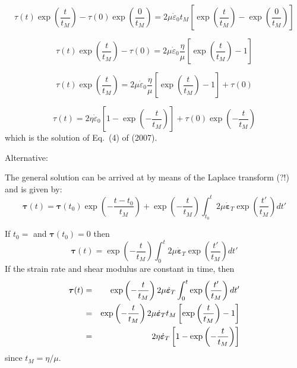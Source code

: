 \[
\tau(t) \exp\left( \frac{t}{t_M}   \right)
-
\tau(0) \exp\left( \frac{0}{t_M}   \right)
 =
 2\mu \dot\varepsilon_0  t_M  [ \exp\left( \frac{t}{t_M}   \right)  -  \exp\left( \frac{0}{t_M} \right) ]
\]

\[
\tau(t) \exp\left( \frac{t}{t_M}   \right)
- \tau(0) 
=
2 \mu  \dot\varepsilon_0 \frac{\eta}{\mu} [ \exp\left( \frac{t}{t_M}   \right) -1 ]
\]

\[
\tau(t) \exp\left( \frac{t}{t_M} \right)
=
2 \mu  \dot\varepsilon_0 \frac{\eta}{\mu} [ \exp\left( \frac{t}{t_M}   \right) -1 ] + \tau(0) 
\]

\[
\tau(t) 
=
2 \eta  \dot\varepsilon_0  [1- \exp\left( -\frac{t}{t_M}\right) ] + \tau(0) \exp\left( -\frac{t}{t_M} \right)
\]
which is the solution of Eq.~(4) of \textcite{kabe07} (2007).

\vspace{1cm}
Alternative:

The general solution can be arrived at  
by means of the Laplace transform (?!) and is given by: 
\[
{\bm \tau}(t) = {\bm \tau}(t_0) \exp\left( -\frac{t-t_0}{t_M} \right) + \exp \left(-\frac{t}{t_M}\right)
\int_{t_0}^{t} 2 \mu \dot{\bm \varepsilon}_T  \exp \left(\frac{t'}{t_M}\right) dt'
\]

If $t_0=$ and ${\bm \tau}(t_0)=0$ then
\[
{\bm \tau}(t) =  \exp \left(-\frac{t}{t_M}\right)
\int_{0}^{t} 2 \mu \dot{\bm \varepsilon}_T  \exp \left( \frac{t'}{t_M} \right) dt'
\]
If the strain rate and shear modulus are constant in time, then 
\begin{eqnarray}
{\bm \tau}(t) 
&=&  \exp \left(-\frac{t}{t_M}\right)
2 \mu \dot{\bm \varepsilon}_T   \int_{0}^{t} \exp \left( \frac{t'}{t_M} \right) dt' \nonumber\\
&=&  \exp \left(-\frac{t}{t_M}\right)
2 \mu \dot{\bm \varepsilon}_T  t_M  \left[ \exp \left( \frac{t}{t_M} \right) -1  \right] \nonumber\\
&=& 
2 \eta \dot{\bm \varepsilon}_T   \left[ 1 - \exp \left( -\frac{t}{t_M} \right)\right] \nonumber
\end{eqnarray}
since $t_M=\eta/\mu$.






















